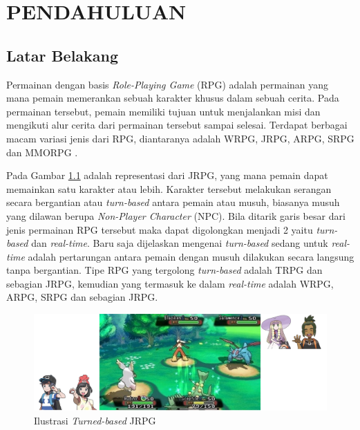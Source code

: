 \chapter{PENDAHULUAN}
\vspace{4ex}
\label{chap:chap1_introduction}

\section{Latar Belakang}
\vspace{1ex}

Permainan dengan basis \textit{Role-Playing Game} (RPG) adalah permainan yang mana pemain memerankan sebuah karakter khusus dalam sebuah cerita. Pada permainan tersebut, pemain memiliki tujuan untuk menjalankan misi dan mengikuti alur cerita dari permainan tersebut sampai selesai. Terdapat berbagai macam variasi jenis dari RPG, diantaranya adalah WRPG, JRPG, ARPG, SRPG dan MMORPG \citep{stenstrom2012}. 
\vspace{1ex}

Pada Gambar \ref{fig:rpg_turn_based} adalah representasi dari JRPG, yang mana pemain dapat memainkan satu karakter atau lebih. Karakter tersebut melakukan serangan secara bergantian atau \textit{turn-based} antara pemain atau musuh, biasanya musuh yang dilawan berupa \textit{Non-Player Character} (NPC). Bila ditarik garis besar dari jenis permainan RPG tersebut maka dapat digolongkan menjadi 2 yaitu \textit{turn-based} dan \textit{real-time}. Baru saja dijelaskan mengenai \textit{turn-based} sedang untuk \textit{real-time} adalah pertarungan antara pemain dengan musuh dilakukan secara langsung tanpa bergantian. Tipe RPG yang tergolong \textit{turn-based} adalah TRPG dan sebagian JRPG, kemudian yang termasuk ke dalam \textit{real-time} adalah WRPG, ARPG, SRPG dan sebagian JRPG.
\vspace{1ex}

\begin{figure} [!h] \centering
	\includegraphics[scale=0.42]{img/turn_based.png}
	\caption{Ilustrasi \textit{Turned-based} JRPG}
	\label{fig:rpg_turn_based}
\end{figure}

